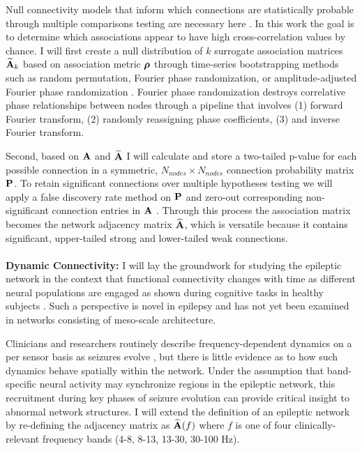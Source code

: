 Null connectivity models that inform which connections are statistically probable through multiple comparisons testing are necessary here \cite{bassett2013robust}. In this work the goal is to determine which associations appear to have high cross-correlation values by chance. I will first create a null distribution of $k$ surrogate association matrices $\widetilde{\mathbf{\displaystyle A}}_k$ based on association metric $\boldsymbol{\displaystyle \rho}$ through time-series bootstrapping methods such as random permutation, Fourier phase randomization, or amplitude-adjusted Fourier phase randomization \cite{bassett2013robust}. Fourier phase randomization destroys correlative phase relationships between nodes through a pipeline that involves (1) forward Fourier transform, (2) randomly reassigning phase coefficients, (3) and inverse Fourier transform.

Second, based on $\mathbf{\displaystyle A}$ and $\widetilde{\mathbf{\displaystyle A}}$ I will calculate and store a two-tailed p-value for each possible connection in a symmetric, $N_{nodes} \times N_{nodes}$ connection probability matrix $\mathbf{\displaystyle P}$. To retain significant connections over multiple hypotheses testing we will apply a false discovery rate method on $\mathbf{\displaystyle P}$ and zero-out corresponding non-significant connection entries in $\mathbf{\displaystyle A}$ \cite{benjamini2001control}. Through this process the association matrix becomes the network adjacency matrix $\widehat{\mathbf{\displaystyle A}}$, which is versatile because it contains significant, upper-tailed strong and lower-tailed weak connections.
~\\
~\\
\textbf{Dynamic Connectivity:}
I will lay the groundwork for studying the epileptic network in the context that functional connectivity changes with time as different neural populations are engaged as shown during cognitive tasks in healthy subjects \cite{bassett2011dynamic}. Such a perspective is novel in epilepsy and has not yet been examined in networks consisting of meso-scale architecture.

Clinicians and researchers routinely describe frequency-dependent dynamics on a per sensor basis as seizures evolve \cite{franaszczuk1998timefrequency, tzallas2009epileptic}, but there is little evidence as to how such dynamics behave spatially within the network. Under the assumption that band-specific neural activity may synchronize regions in the epileptic network, this recruitment during key phases of seizure evolution can provide critical insight to abnormal network structures. I will extend the definition of an epileptic network by re-defining the adjacency matrix as $\widehat{\mathbf{\displaystyle A}}(f)$ where $f$ is one of four clinically-relevant frequency bands (4-8, 8-13, 13-30, 30-100 Hz).

